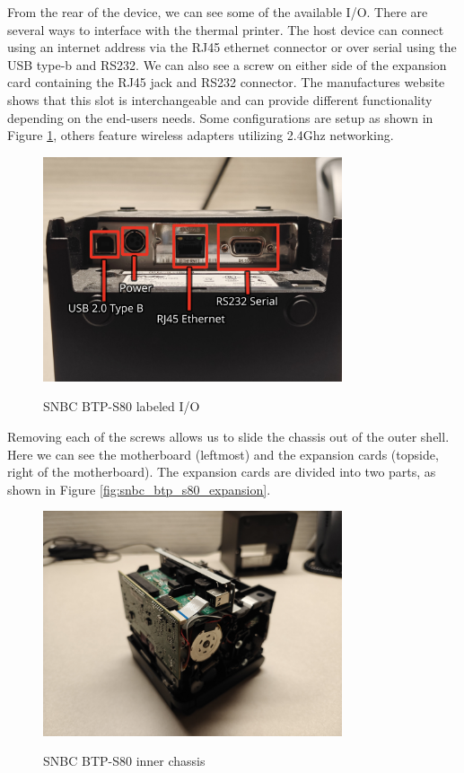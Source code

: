 From the rear of the device, we can see some of the available I/O. There are several ways to interface with the thermal printer. The host device can connect using an internet address via the RJ45 ethernet connector or over serial using the USB type-b and RS232. We can also see a screw on either side of the expansion card containing the RJ45 jack and RS232 connector. The manufactures website shows that this slot is interchangeable and can provide different functionality depending on the end-users needs. Some configurations are setup as shown in Figure \ref{fig:snbc_btp_s80_io}, others feature wireless adapters utilizing 2.4Ghz networking.

\begin{figure}[ht]
    \centering
    {\includegraphics[width=88mm,scale=0.5]
    {Figures/Teardown/IMG20231204170442_annotated.jpg}}
    \caption{SNBC BTP-S80 labeled I/O}
    \label{fig:snbc_btp_s80_io}
\end{figure}

Removing each of the screws allows us to slide the chassis out of the outer shell. Here we can see the motherboard (leftmost) and the expansion cards (topside, right of the motherboard). The expansion cards are divided into two parts, as shown in Figure \ref{fig:snbc_btp_s80_expansion}.

\begin{figure}[ht]
    \centering
    {\includegraphics[width=88mm,scale=0.5]
    {Figures/Teardown/IMG20231204170938.jpg}}
    \caption{SNBC BTP-S80 inner chassis}
    \label{fig:snbc_btp_s80_chassis}
\end{figure}

